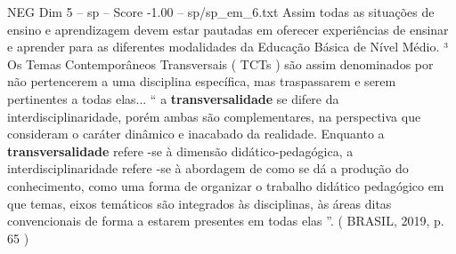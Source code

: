 \begin{textsample}{NEG Dim 5 – sp – Score -1.00 – sp/sp\_em\_6.txt}
Assim todas as situações de ensino e aprendizagem devem estar pautadas em oferecer experiências de ensinar e aprender para as diferentes modalidades da Educação Básica de Nível Médio. ³ Os Temas Contemporâneos Transversais ( TCTs ) são assim denominados por não pertencerem a uma disciplina específica, mas traspassarem e serem pertinentes a todas elas... “ a \textbf{transversalidade} se difere da interdisciplinaridade, porém ambas são complementares, na perspectiva que consideram o caráter dinâmico e inacabado da realidade.
Enquanto a \textbf{transversalidade} refere -se à dimensão didático-pedagógica, a interdisciplinaridade refere -se à abordagem de como se dá a produção do conhecimento, como uma forma de organizar o trabalho didático pedagógico em que temas, eixos temáticos são integrados às disciplinas, às áreas ditas convencionais de forma a estarem presentes em todas elas ”. ( BRASIL, 2019, p. 65 )

\end{textsample}
